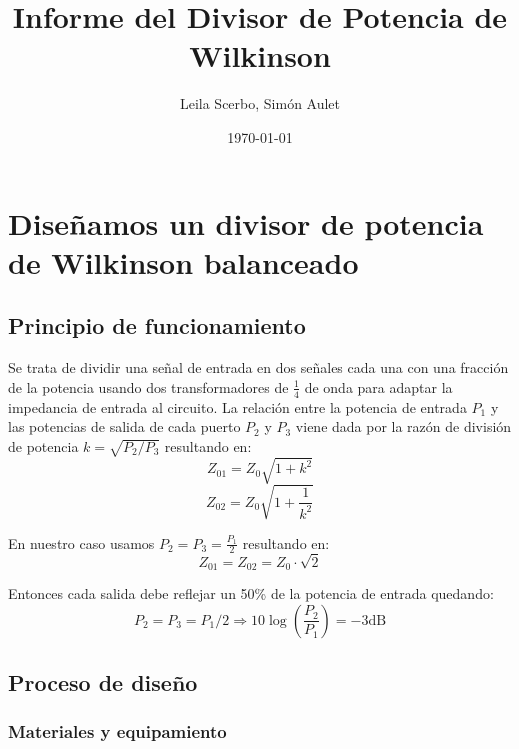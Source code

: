 \documentclass[a4paper, 12pt]{article}
\title{Informe del Divisor de Potencia de Wilkinson}
\author{Leila Scerbo, Simón Aulet}
\date{\today}
\begin{document}
\section{Diseñamos un divisor de potencia de Wilkinson balanceado}

\subsection{Principio de funcionamiento}
Se trata de dividir una señal de entrada en dos señales cada una con una fracción de la potencia usando dos transformadores de $\frac{1}{4}$ de onda para adaptar la impedancia de entrada al circuito. La relación entre la potencia de entrada $P_1$ y las potencias de salida de cada puerto $P_2$ y $P_3$ viene dada por la razón de división de potencia $k = \sqrt{P_2/P_3}$ resultando en:
\begin{equation}
Z_{01} = Z_0 \sqrt{1 + k^2}
\end{equation}
\begin{equation}
Z_{02} = Z_0\sqrt{1 + \frac{1}{k^2}}
\end{equation}

En nuestro caso usamos $P_2 = P_3 = \frac{P_1}{2}$ resultando en:
\begin{equation}
Z_{01} = Z_{02} = Z_0 \cdot \sqrt{2}
\end{equation}

Entonces cada salida debe reflejar un 50\% de la potencia de entrada quedando:
\begin{equation}
P_2 = P_3 = P_1 / 2 \Rightarrow 10\log\left(\frac{P_2}{P_1}\right) = -3\text{dB}
\end{equation}

\subsection{Proceso de diseño}
\subsubsection{Materiales y equipamiento}
\end{document}
